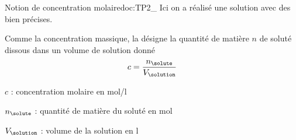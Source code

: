 \begin{doc}{Notion de concentration molaire}{doc:TP2_}
  Ici on a réalisé une solution avec des  bien précises.
  
  \begin{encart}
    Comme la concentration massique, la  désigne la quantité de matière $n$ de soluté dissous dans un volume de solution donné
    \begin{equation*}
      c = \dfrac{n_\solute}{V_\solution}
    \end{equation*}
  \end{encart}
  \begin{listePoints}
    \item $c$ : concentration molaire en \unit{\mole/\litre}
    \item $n_\solute$ : quantité de matière du soluté en \unit{\mole}
    \item $V_\solution$ : volume de la solution en \unit{\litre}
  \end{listePoints}
\end{doc}


